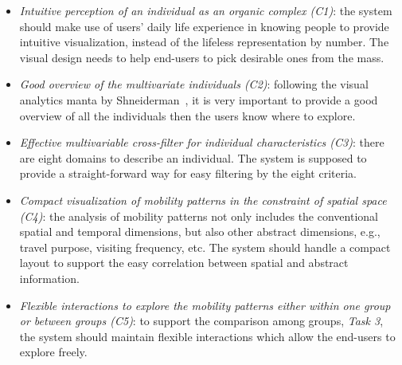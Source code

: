 \begin{itemize}
\item \textit{Intuitive perception of an individual as an organic complex (C1)}: the system should make use of users' daily life experience in knowing people to provide intuitive visualization, instead of the lifeless representation by number. The visual design needs to help end-users to pick desirable ones from the mass.
\item \textit{Good overview of the multivariate individuals (C2)}: following the visual analytics manta by Shneiderman~\citep{RN459}, it is very important to provide a good overview of all the individuals then the users know where to explore.
\item \textit{Effective multivariable cross-filter for individual characteristics (C3)}: there are eight domains to describe an individual. The system is supposed to provide a straight-forward way for easy filtering by the eight criteria.
\item \textit{Compact visualization of mobility patterns in the constraint of spatial space (C4)}: the analysis of mobility patterns not only includes the conventional spatial and temporal dimensions, but also other abstract dimensions, e.g., travel purpose, visiting frequency, etc. The system should handle a compact layout to support the easy correlation between spatial and abstract information.
\item \textit{Flexible interactions to explore the mobility patterns either within one group or between groups (C5)}: to support the comparison among groups, \textit{Task 3}, the system should maintain flexible interactions which allow the end-users to explore freely.
\end{itemize}

